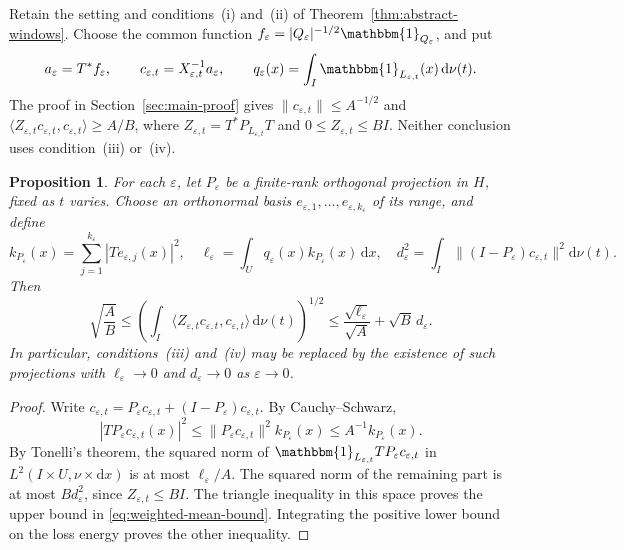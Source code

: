 \documentclass[12pt,reqno,tbtags]{amsart}
\newtheorem{proposition}{Proposition}[section]
\def\d{\mathrm{d}}
\newcommand\norm[1]{\|#1\|}
\newcommand\inpro[2]{\langle #1,#2\rangle}
\newcommand\1{\mathbbm{1}}
\newcommand{\eps}{\varepsilon}
\def\d{\mathrm{d}}
\begin{document}
Retain the setting and conditions~(i) and~(ii) of
Theorem~\ref{thm:abstract-windows}. Choose the common function
$f_\eps=|Q_\eps|^{-1/2}\1_{Q_\eps}$, and put
\begin{equation*}
    a_\eps=T^*f_\eps,\qquad c_{\eps,t}=X_{\eps,t}^{-1}a_\eps,
    \qquad q_\eps(x)=\int_I\1_{L_{\eps,t}}(x)\,\d\nu(t).
\end{equation*}
The proof in Section~\ref{sec:main-proof} gives
$\norm{c_{\eps,t}}\le A^{-1/2}$ and
$\inpro{Z_{\eps,t}c_{\eps,t}}{c_{\eps,t}}\ge A/B$, where
$Z_{\eps,t}=T^*P_{L_{\eps,t}}T$ and $0\le Z_{\eps,t}\le BI$.
Neither conclusion uses condition~(iii) or~(iv).

\begin{proposition}\label{prop:weighted-mean}
For each $\eps$, let $P_\eps$ be a finite-rank orthogonal projection in $H$,
fixed as $t$ varies.
Choose an orthonormal basis $e_{\eps,1},\ldots,e_{\eps,k_\eps}$ of its range,
and define
\begin{equation}\label{eq:weighted-quantities}
    k_{P_\eps}(x)=\sum_{j=1}^{k_\eps}|Te_{\eps,j}(x)|^2,\quad
    \ell_\eps=\int_U q_\eps(x)k_{P_\eps}(x)\,\d x,\quad
    d_\eps^2=\int_I\norm{(I-P_\eps)c_{\eps,t}}^2\d\nu(t).
\end{equation}
Then
\begin{equation}\label{eq:weighted-mean-bound}
    \sqrt{\frac AB}
    \le\left(\int_I\inpro{Z_{\eps,t}c_{\eps,t}}{c_{\eps,t}}
       \,\d\nu(t)\right)^{1/2}
    \le\frac{\sqrt{\ell_\eps}}{\sqrt A}+\sqrt B\,d_\eps.
\end{equation}
In particular, conditions~(iii) and~(iv) may be replaced by the existence
of such projections with $\ell_\eps\to0$ and $d_\eps\to0$ as $\eps\to0$.
\end{proposition}
\begin{proof}
Write $c_{\eps,t}=P_\eps c_{\eps,t}+(I-P_\eps)c_{\eps,t}$.
By Cauchy--Schwarz,
\begin{equation*}
    |TP_\eps c_{\eps,t}(x)|^2
    \le\norm{P_\eps c_{\eps,t}}^2 k_{P_\eps}(x)
    \le A^{-1}k_{P_\eps}(x).
\end{equation*}
By Tonelli's theorem, the squared norm of
$\1_{L_{\eps,t}}TP_\eps c_{\eps,t}$ in $L^2(I\times U,\nu\times\d x)$
is at most $\ell_\eps/A$. The squared norm of the remaining part is at most
$Bd_\eps^2$, since $Z_{\eps,t}\le BI$.
The triangle inequality in this space proves the upper bound in
\eqref{eq:weighted-mean-bound}. Integrating the positive lower bound on
the loss energy proves the other inequality.
\end{proof}
\end{document}
